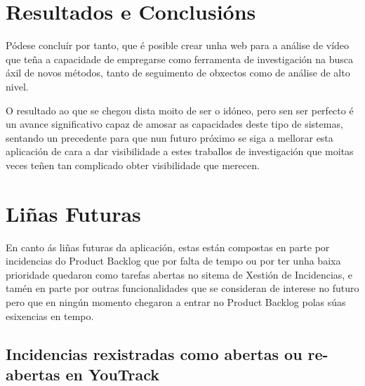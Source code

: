 \chapter{Resultados e Conclusións}

Pódese concluír por tanto, que é posible crear unha web para a análise de vídeo que teña a 
capacidade de empregarse como ferramenta de investigación na busca áxil de novos métodos, tanto
de seguimento de obxectos como de análise de alto nivel.

O resultado ao que se chegou dista moito de ser o idóneo, pero sen ser perfecto é un avance 
significativo capaz de amosar as capacidades deste tipo de sistemas, sentando un precedente para
que nun futuro próximo se siga a mellorar esta aplicación de cara a dar visibilidade a estes 
traballos de investigación que moitas veces teñen tan complicado obter visibilidade que merecen.

\chapter{Liñas Futuras}
\label{sec:linhasFuturas}
    En canto ás liñas futuras da aplicación, estas están compostas en parte por incidencias do 
    Product Backlog que por falta de tempo ou por ter unha baixa prioridade quedaron como tarefas 
    abertas no sitema de Xestión de Incidencias, e tamén en parte por outras funcionalidades que se
    consideran de interese no futuro pero que en ningún momento chegaron a entrar no Product Backlog
    polas súas esixencias en tempo.
    
    \section{Incidencias rexistradas como abertas ou re-abertas en YouTrack}
    
